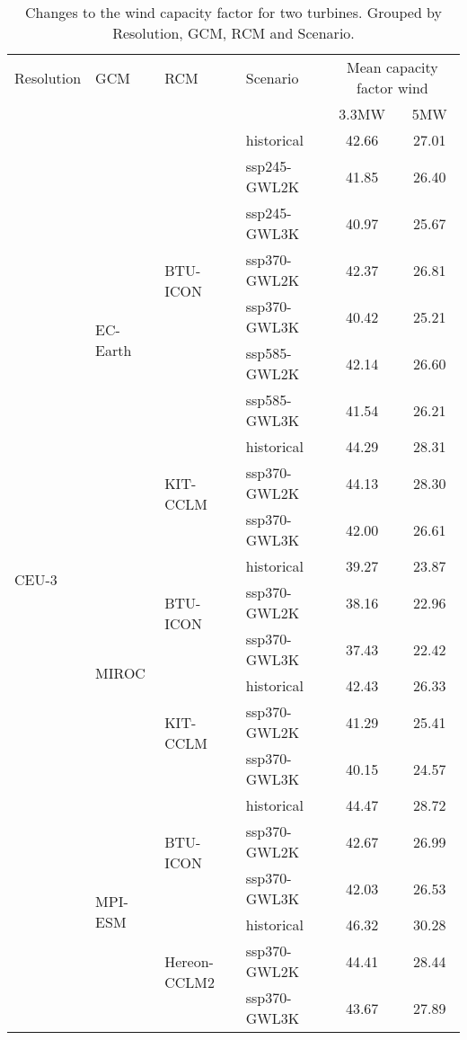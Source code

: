 \begin{table}[!htbp]
\centering
\footnotesize
\caption{Changes to the wind capacity factor for two turbines. Grouped by Resolution, GCM, RCM and Scenario.}
\label{Table:CF_Wind_changes}
\begin{tabular}{lll|l|cc}
\toprule
Resolution & GCM & RCM & Scenario & \multicolumn{2}{c}{Mean capacity factor wind} \\
 & & & & 3.3\si{\mega\watt} & 5\si{\mega\watt}  \\
\midrule
\multirow{22}{*}{CEU-3} & \multirow{10}{*}{EC-Earth} & \multirow{7}{*}{BTU-ICON} & historical & 42.66 & 27.01 \\
 &  &  & ssp245-GWL2K & 41.85 & 26.40 \\
 &  &  & ssp245-GWL3K & 40.97 & 25.67 \\
 &  &  & ssp370-GWL2K & 42.37 & 26.81 \\
 &  &  & ssp370-GWL3K & 40.42 & 25.21 \\
 &  &  & ssp585-GWL2K & 42.14 & 26.60 \\
 &  &  & ssp585-GWL3K & 41.54 & 26.21 \\
\cmidrule(lr){3-6}
 &  & \multirow{3}{*}{KIT-CCLM} & historical & 44.29 & 28.31 \\
 &  &  & ssp370-GWL2K & 44.13 & 28.30 \\
 &  &  & ssp370-GWL3K & 42.00 & 26.61 \\
\cmidrule(lr){3-6}
\cmidrule(lr){2-6}
 & \multirow{6}{*}{MIROC} & \multirow{3}{*}{BTU-ICON} & historical & 39.27 & 23.87 \\
 &  &  & ssp370-GWL2K & 38.16 & 22.96 \\
 &  &  & ssp370-GWL3K & 37.43 & 22.42 \\
\cmidrule(lr){3-6}
 &  & \multirow{3}{*}{KIT-CCLM} & historical & 42.43 & 26.33 \\
 &  &  & ssp370-GWL2K & 41.29 & 25.41 \\
 &  &  & ssp370-GWL3K & 40.15 & 24.57 \\
\cmidrule(lr){3-6}
\cmidrule(lr){2-6}
 & \multirow{6}{*}{MPI-ESM} & \multirow{3}{*}{BTU-ICON} & historical & 44.47 & 28.72 \\
 &  &  & ssp370-GWL2K & 42.67 & 26.99 \\
 &  &  & ssp370-GWL3K & 42.03 & 26.53 \\
\cmidrule(lr){3-6}
 &  & \multirow{3}{*}{Hereon-CCLM2} & historical & 46.32 & 30.28 \\
 &  &  & ssp370-GWL2K & 44.41 & 28.44 \\
 &  &  & ssp370-GWL3K & 43.67 & 27.89 \\

\end{tabular}
\end{table}

